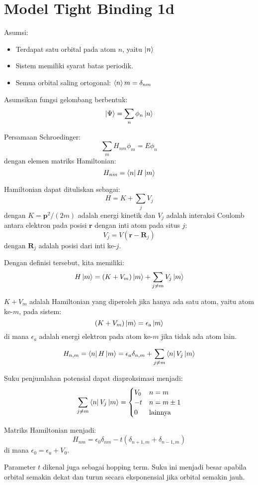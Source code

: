 \chapter{Model Tight Binding 1d}

Asumsi:

\begin{itemize}
\item Terdapat satu orbital pada atom $n$, yaitu $\ket{n}$
\item Sistem memiliki syarat batas periodik.
\item Semua orbital saling ortogonal: $\braket{n}{m} = \delta_{nm}$
\end{itemize}

Asumsikan fungsi gelombang berbentuk:
\[
\ket{\Psi} = \sum_{n} \phi_{n} \ket{n}
\]

    Persamaan Schroedinger: \[
\sum_{m} H_{nm} \phi_{m} = E \phi_{n}
\] dengan elemen matriks Hamiltonian: \[
H_{nm} = \bra{n}H\ket{m}
\]

    Hamiltonian dapat dituliskan sebagai: \[
H = K + \sum_{j} V_{j}
\] dengan $K = \mathbf{p}^2/(2m)$ adalah energi kinetik dan $V_{j}$
adalah interaksi Coulomb antara elektron pada posisi $\mathbf{r}$
dengan inti atom pada situs $j$: \[
V_{j} = V(\mathbf{r} - \mathbf{R}_{j})
\] dengan $\mathbf{R}_{j}$ adalah posisi dari inti ke-$j$.

    Dengan definisi tersebut, kita memiliki: \[
H\ket{m} = (K + V_{m})\ket{m} + \sum_{j \neq m} V_{j}\ket{m}
\]

    $K + V_{m}$ adalah Hamiltonian yang diperoleh jika hanya ada satu
atom, yaitu atom ke-$m$, pada sistem: \[
(K + V_{m})\ket{m} = \epsilon_{\mathrm{a}}\ket{m}
\] di mana $\epsilon_{a}$ adalah energi elektron pada atom ke-$m$
jika tidak ada atom lain.

    \[
H_{n,m} = \bra{n}H\ket{m} = \epsilon_{a}\delta_{n,m} + \sum_{j \neq m} \bra{n}V_{j}\ket{m}
\]

    Suku penjumlahan potensial dapat diaproksimasi menjadi: \[
\sum_{j \neq m} \bra{n}V_{j}\ket{m} = \begin{cases}
V_{0} & n = m \\
-t & n = m \pm 1 \\
0 & \text{lainnya}
\end{cases}
\]

    Matriks Hamiltonian menjadi: \[
H_{nm} = \epsilon_{0}\delta_{nm} - t(\delta_{n+1,m} + \delta_{n-1,m})
\] di mana $\epsilon_{0} = \epsilon_{a} + V_{0}$.

    Parameter $t$ dikenal juga sebagai hopping term. Suku ini menjadi
besar apabila orbital semakin dekat dan turun secara eksponensial jika
orbital semakin jauh.


